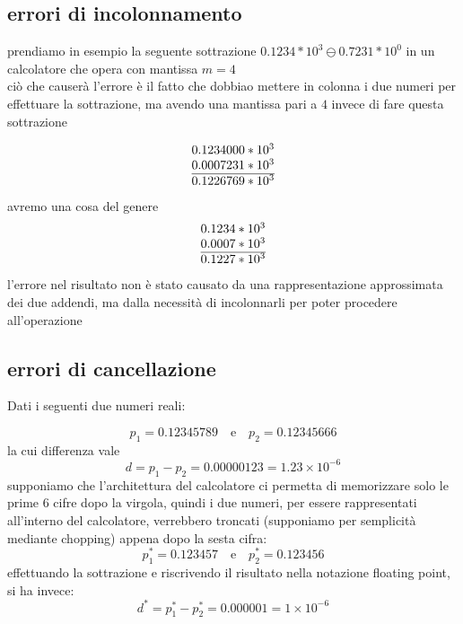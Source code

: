 \documentclass{article}
\begin{document}
\subsection{errori di incolonnamento}
\normalsize prendiamo in esempio la seguente sottrazione $0.1234*10^3 \ominus 0.7231 * 10^0$ in un calcolatore che opera con mantissa $m = 4$
\\
ciò che causerà l'errore è il fatto che dobbiao mettere in colonna i due numeri per effettuare la sottrazione, ma avendo una mantissa pari a $4$ invece di fare questa sottrazione        

\begin{equation}
 \begin{tabular}{@{}r@{}}
  $0.1234000*10^3$ \\
  $0.0007231 * 10^3$ \\
  \hline
  $0.1226769 * 10^3$
\end{tabular}   
\end{equation}
avremo una cosa del genere 
\begin{equation}
\begin{tabular}{@{}r@{}}
  $0.1234*10^3$ \\
  $0.0007 * 10^3$ \\
  \hline
  $0.1227 * 10^3$
\end{tabular}   
\end{equation}
l’errore nel risultato non è stato causato da una
rappresentazione approssimata dei due addendi, ma dalla
necessità di incolonnarli per poter procedere
all’operazione
\subsection{errori di cancellazione}
Dati i seguenti due numeri reali:

\[
p_1 = 0.12345789 \quad \text{e} \quad p_2 = 0.12345666
\]
la cui differenza vale
\[
d = p_1 - p_2 = 0.00000123 = 1.23 \times 10^{-6}
\]
supponiamo che l'architettura del calcolatore ci permetta di memorizzare solo le prime 6 cifre dopo la virgola, quindi i due numeri, per essere rappresentati all'interno del calcolatore, verrebbero troncati (supponiamo per semplicità mediante chopping) appena dopo la sesta cifra:
\[
p_1^* = 0.123457 \quad \text{e} \quad p_2^* = 0.123456
\]
effettuando la sottrazione e riscrivendo il risultato nella notazione floating point, si ha invece:
\[
d^* = p_1^* - p_2^* = 0.000001 = 1 \times 10^{-6}
\]
\end{document}
